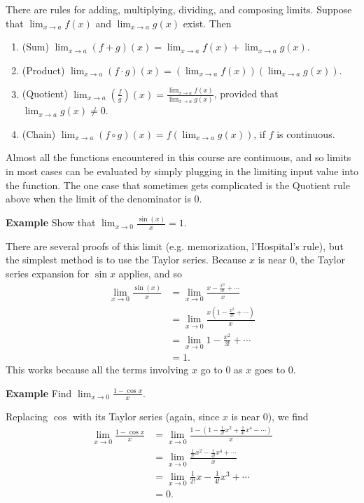 \documentclass[twoside,openright,titlepage,a4paper]{book}
\begin{document}
\begin{sloppypar}
There are rules for adding, multiplying, dividing, and composing limits. Suppose that $\displaystyle \lim_{x \rightarrow a} f(x)$ and $\displaystyle \lim_{x \rightarrow a} g(x)$ exist. Then
\begin{enumerate}
\item (Sum) $\displaystyle \lim_{x \rightarrow a} (f+g)(x) = \lim_{x \rightarrow a} f(x) + \lim_{x \rightarrow a} g(x)$.
\item (Product) $\displaystyle \lim_{x \rightarrow a} (f \cdot g)(x) = \left(\lim_{x \rightarrow a}f(x)\right)\left(\lim_{x \rightarrow a} g(x)\right)$.
\item (Quotient) $\displaystyle \lim_{x \rightarrow a} \left(\frac{f}{g}\right)(x) = \frac{\lim_{x \rightarrow a} f(x)}{\lim_{x \rightarrow a} g(x)}$, provided that $\displaystyle \lim_{x \rightarrow a} g(x) \neq 0$.
\item (Chain) $\displaystyle \lim_{x \rightarrow a} (f \circ g)(x) = f\left(\lim_{x \rightarrow a} g(x)\right)$, if $f$ is continuous.
\end{enumerate}

Almost all the functions encountered in this course are continuous, and so limits in most cases can be evaluated by simply plugging in the limiting input value into the function. The one case that sometimes gets complicated is the Quotient rule above when the limit of the denominator is 0.

\textbf{Example} Show that $\displaystyle \lim_{x\rightarrow 0}\frac{\sin(x)}{x} = 1$. 
\begin{examplebox}
There are several proofs of this limit (e.g. memorization, l'Hospital's rule), but the simplest method is to use the Taylor series. Because $x$ is near 0, the Taylor series expansion for $\sin x$ applies, and so
\begin{align*}
\lim_{x \rightarrow 0} \frac{\sin(x)}{x} &= \lim_{x\rightarrow 0} \frac{x-\frac{x^3}{3!}+\dotsb}{x} \\
&= \lim_{x\rightarrow 0} \frac{x \left(1-\frac{x^2}{3!}+\dotsb\right)}{x} \\
&= \lim_{x\rightarrow 0} 1-\frac{x^2}{3!} +\dotsb \\
&= 1. 
\end{align*}
This works because all the terms involving $x$ go to 0 as $x$ goes to 0.
\end{examplebox}

\textbf{Example} Find $\displaystyle \lim_{x\rightarrow 0} \frac{1-\cos x}{x}$. 
\begin{examplebox}
Replacing $\cos$ with its Taylor series (again, since $x$ is near 0), we find
\begin{align*} 
\lim_{x \rightarrow 0} \frac{1-\cos x}{x} &= \lim_{x \rightarrow 0} \frac{1-\left(1-\frac{1}{2!}x^2 + \frac{1}{4!}x^4 - \dotsb \right)}{x} \\
&= \lim_{x \rightarrow 0} \frac{\frac{1}{2!}x^2 - \frac{1}{4!}x^4 + \dotsb}{x} \\
&= \lim_{x \rightarrow 0} \frac{1}{2!}x - \frac{1}{4!}x^3 + \dotsb \\
&= 0. 
\end{align*}
\end{examplebox}


\end{sloppypar}
\end{document}
